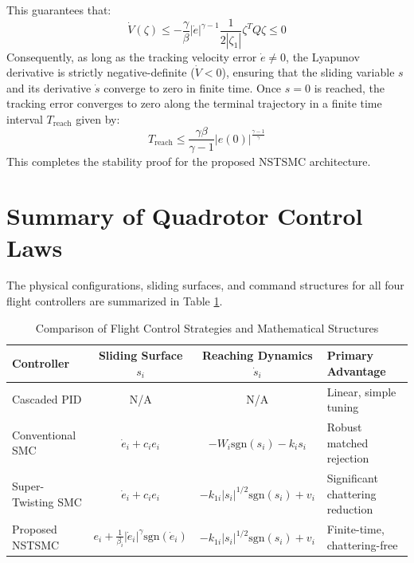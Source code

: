 This guarantees that:
\begin{equation}
\dot{V}(\zeta) \leq -\frac{\gamma}{\beta} |\dot{e}|^{\gamma - 1} \frac{1}{2|\zeta_1|} \zeta^T Q \zeta \leq 0
\end{equation}
Consequently, as long as the tracking velocity error $\dot{e} \neq 0$, the Lyapunov derivative is strictly negative-definite ($\dot{V} < 0$), ensuring that the sliding variable $s$ and its derivative $\dot{s}$ converge to zero in finite time. Once $s=0$ is reached, the tracking error converges to zero along the terminal trajectory in a finite time interval $T_{\text{reach}}$ given by:
\begin{equation}
T_{\text{reach}} \leq \frac{\gamma \beta}{\gamma - 1} |e(0)|^{\frac{\gamma - 1}{\gamma}}
\end{equation}
This completes the stability proof for the proposed NSTSMC architecture.

\section{Summary of Quadrotor Control Laws}
The physical configurations, sliding surfaces, and command structures for all four flight controllers are summarized in Table \ref{tab:controller_comparison}.

\begin{table}[h!]
\centering
\caption{Comparison of Flight Control Strategies and Mathematical Structures}
\label{tab:controller_comparison}
\begin{tabular}{|l|c|c|l|}
\hline
\textbf{Controller} & \textbf{Sliding Surface $s_i$} & \textbf{Reaching Dynamics $\dot{s}_i$} & \textbf{Primary Advantage} \\
\hline
Cascaded PID & N/A & N/A & Linear, simple tuning \\
Conventional SMC & $\dot{e}_i + c_i e_i$ & $-W_i \text{sgn}(s_i) - k_i s_i$ & Robust matched rejection \\
Super-Twisting SMC & $\dot{e}_i + c_i e_i$ & $-k_{1i}|s_i|^{1/2}\text{sgn}(s_i) + v_i$ & Significant chattering reduction \\
Proposed NSTSMC & $e_i + \frac{1}{\beta_i}|\dot{e}_i|^{\gamma}\text{sgn}(\dot{e}_i)$ & $-k_{1i}|s_i|^{1/2}\text{sgn}(s_i) + v_i$ & Finite-time, chattering-free \\
\hline
\end{tabular}
\end{table}

